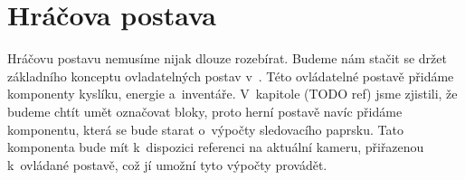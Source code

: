 
\section{Hráčova postava}
Hráčovu postavu nemusíme nijak dlouze rozebírat. Budeme nám stačit se držet základního konceptu ovladatelných postav v~\UEu{}. Této ovládatelné postavě přidáme komponenty kyslíku, energie a~inventáře. V~kapitole (TODO ref) jsme zjistili, že budeme chtít umět označovat bloky, proto herní postavě navíc přidáme komponentu, která se bude starat o~výpočty sledovacího paprsku. Tato komponenta bude mít k~dispozici referenci na aktuální kameru, přiřazenou k~ovládané postavě, což jí umožní tyto výpočty provádět.
